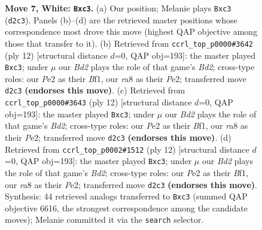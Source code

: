 \documentclass[11pt]{article}
\begin{document}
\begin{figure}[p]
\caption{\textbf{Move 7, White: \texttt{Bxc3}.} (a) Our position; Melanie plays \texttt{Bxc3} (\texttt{d2c3}). Panels (b)--(d) are the retrieved master positions whose correspondence most drove this move (highest QAP objective among those that transfer to it). (b) Retrieved from \texttt{ccrl\_top\_p0000\#3642} (ply 12) [structural distance $d$=0, QAP obj=193]: the master played \texttt{Bxc3}; under $\mu$ our \emph{Bd2} plays the role of that game's \emph{Bd2}; cross-type roles: our \emph{P}e2 as their \emph{B}f1, our \emph{r}a8 as their \emph{P}e2; transferred move \texttt{d2c3} \textbf{(endorses this move)}. (c) Retrieved from \texttt{ccrl\_top\_p0000\#3643} (ply 12) [structural distance $d$=0, QAP obj=193]: the master played \texttt{Bxc3}; under $\mu$ our \emph{Bd2} plays the role of that game's \emph{Bd2}; cross-type roles: our \emph{P}e2 as their \emph{B}f1, our \emph{r}a8 as their \emph{P}e2; transferred move \texttt{d2c3} \textbf{(endorses this move)}. (d) Retrieved from \texttt{ccrl\_top\_p0002\#1512} (ply 12) [structural distance $d$=0, QAP obj=193]: the master played \texttt{Bxc3}; under $\mu$ our \emph{Bd2} plays the role of that game's \emph{Bd2}; cross-type roles: our \emph{P}e2 as their \emph{B}f1, our \emph{r}a8 as their \emph{P}e2; transferred move \texttt{d2c3} \textbf{(endorses this move)}. Synthesis: 44 retrieved analogs transferred to \texttt{Bxc3} (summed QAP objective 6616, the strongest correspondence among the candidate moves); Melanie committed it via the \texttt{search} selector.}
\label{fig:thought-m12}
\end{figure}

\clearpage
\end{document}
